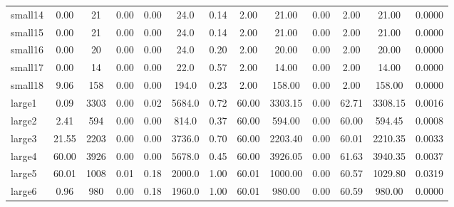 \documentclass[sigconf]{acmart}
\begin{document}
\begin{table}[t]
\begin{tabular}{l|ccc|ccc|ccc|ccc}
    small14  & 0.00                                  & 21                          & 0.00                     & 0.00                    & 24.0   & 0.14   & 2.00    & 21.00   & 0.00   & 2.00    & 21.00   & 0.0000 \\
    small15  & 0.00                                  & 21                          & 0.00                     & 0.00                    & 24.0   & 0.14   & 2.00    & 21.00   & 0.00   & 2.00    & 21.00   & 0.0000 \\
    small16  & 0.00                                  & 20                          & 0.00                     & 0.00                    & 24.0   & 0.20   & 2.00    & 20.00   & 0.00   & 2.00    & 20.00   & 0.0000 \\
    small17  & 0.00                                  & 14                          & 0.00                     & 0.00                    & 22.0   & 0.57   & 2.00    & 14.00   & 0.00   & 2.00    & 14.00   & 0.0000 \\
    small18  & 9.06                                  & 158                         & 0.00                     & 0.00                    & 194.0  & 0.23   & 2.00    & 158.00  & 0.00   & 2.00    & 158.00  & 0.0000 \\
    large1   & 0.09                                  & 3303                        & 0.00                     & 0.02                    & 5684.0 & 0.72   & 60.00   & 3303.15 & 0.00   & 62.71   & 3308.15 & 0.0016 \\
    large2   & 2.41                                  & 594                         & 0.00                     & 0.00                    & 814.0  & 0.37   & 60.00   & 594.00  & 0.00   & 60.00   & 594.45  & 0.0008 \\
    large3   & 21.55                                 & 2203                        & 0.00                     & 0.00                    & 3736.0 & 0.70   & 60.00   & 2203.40 & 0.00   & 60.01   & 2210.35 & 0.0033 \\
    large4   & 60.00                                 & 3926                        & 0.00                     & 0.00                    & 5678.0 & 0.45   & 60.00   & 3926.05 & 0.00   & 61.63   & 3940.35 & 0.0037 \\
    large5   & 60.01                                 & 1008                        & 0.01                     & 0.18                    & 2000.0 & 1.00   & 60.01   & 1000.00 & 0.00   & 60.57   & 1029.80 & 0.0319 \\
    large6   & 0.96                                  & 980                         & 0.00                     & 0.18                    & 1960.0 & 1.00   & 60.01   & 980.00  & 0.00   & 60.59   & 980.00  & 0.0000 \\

\end{tabular}
\end{table}
\end{document}
